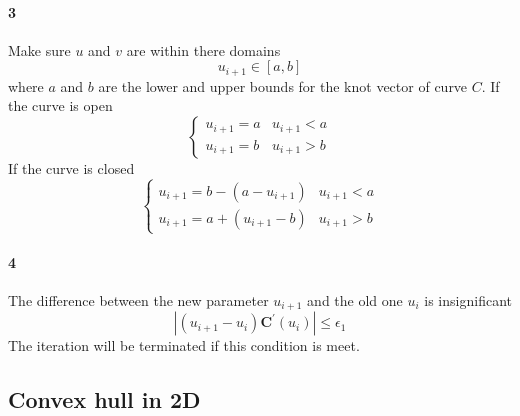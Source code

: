 \paragraph{3}
Make sure $u$ and $v$ are within there domains
\begin{equation*}
    u_{i+1} \in [a,b]
\end{equation*}
%
where $a$ and $b$ are the lower and upper bounds for the knot vector of curve $C$.
If the curve is open
\begin{equation}
    \left\{
        \begin{array}{rl}
            u_{i+1} = a & u_{i+1} < a \\
            u_{i+1} = b & u_{i+1} > b
        \end{array}
    \right.
\end{equation}
%
If the curve is closed
\begin{equation}
    \left\{
        \begin{array}{rl}
            u_{i+1} = b - ( a - u_{i+1} ) & u_{i+1} < a \\
            u_{i+1} = a + ( u_{i+1} - b ) & u_{i+1} > b
        \end{array}
    \right.
\end{equation}
%
\paragraph{4}
The difference between the new parameter $u_{i+1}$ and the old one $u_i$ is insignificant
\begin{equation*}
    |
        (u_{i+1} - u_i)\mathbf{C}^\prime(u_i)
    |
    \leq \epsilon_1
\end{equation*}
The iteration will be terminated if this condition is meet.



\subsection{Convex hull in 2D}
\label{qdt_sc:convex_hull}
